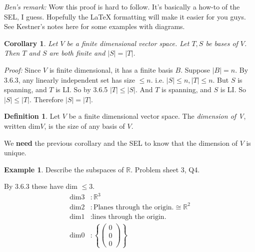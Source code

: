 \documentclass{report}
\newtheorem*{corollary}{Corollary}
\theoremstyle{remark}
\theoremstyle{definition}
\newtheorem{definition}[theorem]{Definition}
\theoremstyle{definition}
\newtheorem{example}[theorem]{Example}
\theoremstyle{theorem}
\begin{document}
\emph{Ben's remark:} Wow this proof is hard to follow. It's basically a how-to of the SEL, I guess. Hopefully the \LaTeX{} formatting will make it easier for you guys. See Kestner's notes here for some examples with diagrams.
\begin{corollary}
Let $V$ be a finite dimensional vector space. Let $T,S$ be bases of $V$. Then $T$ and $S$ are both finite and $|S| = |T|$.
\end{corollary}
\emph{Proof:} Since $V$ is finite dimensional, it has a finite basis $B$. Suppose $|B|=n$. By 3.6.3, any linearly independent set has size $\leq n$. i.e. $|S| \leq n, |T| \leq n$. But $S$ is spanning, and $T$ is LI. So by 3.6.5 $|T| \leq |S|$. And $T$ is spanning, and $S$ is LI. So $|S| \leq |T|$. Therefore $|S|=|T|$.
\begin{definition}
Let $V$ be a finite dimensional vector space. The \emph{dimension of V}, written dim$V$, is the size of any basis of $V$.
\end{definition}
We \textbf{need} the previous corollary and the SEL to know that the dimension of $V$ is unique.
\begin{example}
Describe the subspaces of $\mathbb{R}$. Problem sheet 3, Q4.
\end{example}
By 3.6.3 these have dim $\leq 3$.
\begin{align*}
    \text{dim}3 &: \mathbb{R}^3\\
    \text{dim}2&: \text{Planes through the origin.} \cong \mathbb{R}^2\\
    \text{dim}1&:\text{lines through the origin.}\\
    \text{dim}0&: \left\{\begin{pmatrix}0\\0\\0\end{pmatrix}\right\}
\end{align*}
\end{document}
